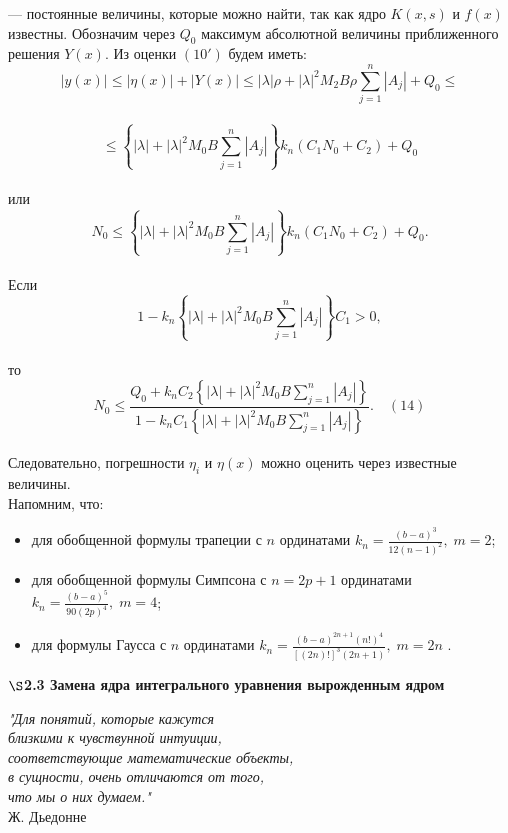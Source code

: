 \documentclass[12pt]{article}
\begin{document}
— постоянные величины, которые можно найти, так как ядро $ K(x,s) $ и $ f(x) $ известны. Обозначим через $ Q_0 $ максимум абсолютной величины приближенного решения $ Y(x) $. Из оценки $ (10') $ будем иметь: \\
$$ |y(x)| \leqslant |\eta(x)| + |Y(x)| \leqslant |\lambda|\rho + |\lambda|^2 M_2 B\rho \sum\limits_{j=1}^n |A_j| + Q_0 \leqslant$$ 
\\
 $$\leqslant \left\lbrace |\lambda| + |\lambda|^2M_0B\sum\limits_{j=1}^n |A_j|\right\rbrace k_n (C_1 N_0 + C_2) + Q_0  $$\\
или\\
$$ N_0 \leqslant \left\lbrace |\lambda| + |\lambda|^2 M_0B\sum\limits_{j=1}^n |A_j|\right\rbrace k_n (C_1 N_0 + C_2) + Q_0 .  $$\\
Если\\
$$ 1 - k_n \left\lbrace |\lambda| + |\lambda|^2 M_0B\sum\limits_{j=1}^n |A_j| \right\rbrace C_1 > 0 ,  $$\\
то\\
$$ N_0 \leqslant \frac{Q_0 + k_nC_2 \left\lbrace  |\lambda| + |\lambda|^2 M_0B\sum\limits_{j=1}^n |A_j| \right\rbrace }{1 - k_nC_1 \left\lbrace |\lambda| + |\lambda|^2 M_0B\sum\limits_{j=1}^n |A_j| \right\rbrace } . \quad (14) $$\\
Следовательно, погрешности $ \eta_i $ и $ \eta(x) $ можно оценить через известные величины. \\

Напомним, что: \\
\begin{itemize}
	 \item   для обобщенной формулы трапеции с $ n $ ординатами $ k_n = \frac{(b-a)^3}{12(n-1)^2}, \; m=2 $; \\
	 \item   для обобщенной формулы Симпсона с $ n=2p+1 $ ординатами $ k_n = \frac{(b-a)^5}{90(2p)^4}, \; m=4 $; \\
	 \item   для формулы Гаусса с $ n $ ординатами $ k_n = \frac{(b-a)^{2n+1}(n!)^4}{[(2n)!]^3(2n+1)}, \; m = 2n $ .
\end{itemize}

\newpage
\begin{center}
	\textbf{$ \S $2.3 Замена ядра интегрального уравнения вырожденным ядром }
\end{center}
\begin{flushright}
	\textit{"Для понятий, которые кажутся\\
		близкими к чувствунной интуиции,\\
		соответствующие математические объекты,\\
		в сущности, очень отличаются от того,\\
		что мы о них думаем."}\\
	Ж. Дьедонне
\end{flushright}
\end{document}
